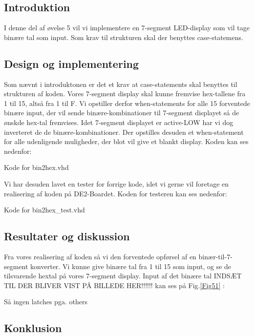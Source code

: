 \documentclass[../journal.tex]{subfiles}
\begin{document}
\subsection{Introduktion}
I denne del af øvelse 5 vil vi implementere en 7-segment LED-display som vil tage binære tal som input. Som krav til strukturen skal der benyttes case-statemens.

\subsection{Design og implementering}
Som nævnt i introduktonen er det et krav at case-statements skal benyttes til strukturen af koden. Vores 7-segment display skal kunne fremvise hex-tallene fra 1 til 15, altså fra 1 til F. Vi opstiller derfor when-statements for alle 15 forventede binære input, der vil sende binære-kombinationer til 7-segment displayet så de ønskde hex-tal fremvises. Idet 7-segment displayet er active-LOW har vi dog inverteret de de binære-kombinationer. Der opstilles desuden et when-statement for alle udenligende muligheder, der blot vil give et blankt display. Koden kan ses nedenfor:

\begin{table}[H]
    \centering
      \framebox{
        \rule{8pt}{0pt}
          
  }
  \caption{Kode for bin2hex.vhd}	
  \label{src:TabCon}
\end{table}

Vi har desuden lavet en tester for forrige kode, idet vi gerne vil foretage en realisering af koden på DE2-Boardet. Koden for testeren kan ses nedenfor:

\begin{table}[H]
    \centering
      \framebox{
        \rule{8pt}{0pt}
          
  }
  \caption{Kode for bin2hex\_test.vhd}	
  \label{src:TabConTest}
\end{table}

\subsection{Resultater og diskussion}

Fra vores realisering af koden så vi den forventede opførsel af en binær-til-7-segment konverter. Vi kunne give binære tal fra 1 til 15 som input, og se de tilsvarende hextal på vores 7-segment display. Input af det binære tal INDSÆT TIL DER BLIVER VIST PÅ BILLEDE HER!!!!!! kan ses på Fig.\ref{Fig51} :



Så ingen latches pga. others


\subsection{Konklusion}
\end{document}
